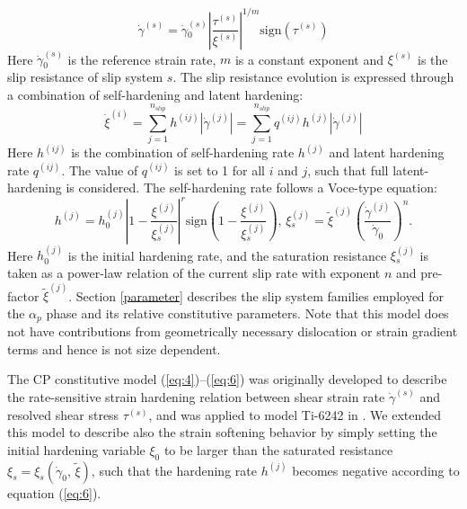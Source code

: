\documentclass[review]{elsarticle}
\begin{document}
	\begin{equation}
	\dot{\gamma}^{(s)} = \dot{\gamma}{_0^{(s)}} \left| \frac{\tau^{(s)}}{\xi^{(s)}} \right| ^{1/m} \text{sign} \left( \tau^{(s)} \right)
	\label{eq:4}
	\end{equation}
	Here $\dot{\gamma}{_0^{(s)}}$ is the reference strain rate, $m$ is a constant exponent and $\xi^{(s)}$ is the slip resistance of slip system $s$.
	The slip resistance evolution is expressed through a combination of self-hardening and latent hardening:
	\begin{equation}
	\label{eq:5}
	\dot{\xi}^{(i)} = \sum_{j=1}^{n_{slip}} h^{(ij)} \left| \dot{\gamma}^{(j)} \right| = \sum_{j=1}^{n_{slip}} q^{(ij)} h^{(j)} \left| \dot{\gamma}^{(j)} \right|
	\end{equation}
	Here $h^{(ij)}$ is the combination of self-hardening rate $h^{(j)}$ and latent hardening rate $q^{(ij)}$.
	The value of $q^{(ij)}$ is set to 1 for all $i$ and $j$, such that full latent-hardening is considered. The self-hardening rate follows a Voce-type equation:
	\begin{equation}
	h^{(j)} = h{_0^{(j)}} \left| 1-\frac{\xi^{(j)}}{\xi{_s^{(j)}}} \right|^r \text{sign} \left( 1-\frac{\xi^{(j)}}{\xi{_s^{(j)}}} \right),\,
	\xi{_s^{(j)}} = \tilde{\xi}^{(j)} \left( \frac{\dot{\gamma}^{(j)}}{\dot{\gamma}_0} \right) ^n .
	\label{eq:6}
	\end{equation}
	Here $h{_0^{(j)}}$ is the initial hardening rate, and the saturation resistance $\xi{_s^{(j)}}$ is taken as a power-law relation of the current slip rate with exponent $n$ and pre-factor $\tilde{\xi} ^{(j)}$.
	Section \ref{parameter} describes the slip system families employed for the $\alpha _p$ phase and its relative constitutive parameters.
	Note that this model does not have contributions from geometrically necessary dislocation or strain gradient terms and hence is not size dependent.
	
    The CP constitutive model (\ref{eq:4})--(\ref{eq:6}) was originally developed to describe the rate-sensitive strain hardening relation between shear strain rate $\dot{\gamma}^{(s)}$ and resolved shear stress $\tau^{(s)}$, and was applied to model Ti-6242 in \cite{r18}.
      We extended this model to describe also the strain softening behavior by simply setting the initial hardening variable $\xi_0$ to be larger than the saturated resistance $\xi_s = \xi_s \left( \dot{\gamma}_0 ,\, \tilde{\xi} \right)$, such that the hardening rate $h^{(j)}$ becomes negative according to equation (\ref{eq:6}).
\end{document}
